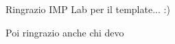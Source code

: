 \vspace*{10pc}
\thispagestyle{empty}
\begin{flushright}
\sl

Ringrazio IMP Lab per il template... :)

Poi ringrazio anche chi devo

\end{flushright}
\par\vfill\par
